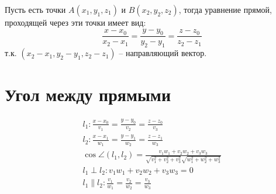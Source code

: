 

\begin{definition}
    Пусть есть точки $A(x_1, y_1, z_1)$ и $B(x_2, y_2, z_2)$, тогда уравнение прямой, проходящей через эти точки имеет вид:
    \[\frac{x-x_0}{x_2-x_1} = \frac{y-y_0}{y_2-y_1} = \frac{z-z_0}{z_2-z_1}\]
    т.к. $(x_2-x_1, y_2-y_1, z_2-z_1)$ -- направляющий вектор.
\end{definition}


\section{Угол между прямыми}

\begin{definition}
    \begin{gather*}
        l_1: \frac{x-x_0}{v_1} = \frac{y-y_0}{v_2} = \frac{z-z_0}{v_3}\\
        l_2: \frac{x-x_1}{w_1} = \frac{y-y_1}{w_2} = \frac{z-z_1}{w_3}\\
        \cos\angle(l_1, l_2) = \frac{v_1 w_1 + v_2 w_2 + v_3 w_3}
        {\sqrt{v_1^2+v_2^2+v_3^2} \sqrt{w_1^2+w_2^2+w_3^2}}\\
        l_1 \perp l_2: v_1 w_1 + v_2 w_2 + v_3 w_3  = 0\\
        l_1 \parallel l_2: \frac{v_1}{w_1} = \frac{v_2}{w_2} = \frac{v_3}{w_3}
    \end{gather*}
\end{definition}

